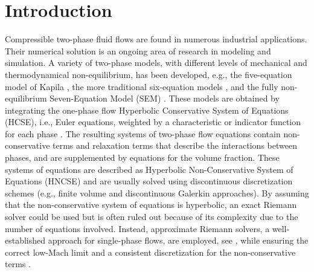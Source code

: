 \section{Introduction}\label{sec:intro}
%
Compressible two-phase fluid flows are found in numerous industrial applications. Their numerical solution is an ongoing area of research 
in modeling and simulation. 
A variety of two-phase models, with different levels of mechanical and thermodynamical non-equilibrium, has been developed, e.g., 
the five-equation model of Kapila \cite{Kapila_2001,GuillardMurrone2003,Saurel_2009}, 
the more traditional six-equation models \cite{Stadtke}, 
and the fully non-equilibrium Seven-Equation Model (SEM) \cite{Berry_1985,BaerNunziato,Saurel_2001b,SEM}. 
These models are obtained by integrating the one-phase flow Hyperbolic Conservative System of Equations (HCSE), 
i.e., Euler equations, weighted by a characteristic or indicator function for each phase \cite{DrewPassman,SEM}.
The resulting systems of two-phase flow equations contain non-conservative terms and relaxation terms that 
describe the interactions between phases, and are supplemented by equations for the volume fraction. 
These systems of equations are described as Hyperbolic Non-Conservative System of Equations (HNCSE) 
and are usually solved using discontinuous discretization schemes (e.g., finite volume and discontinuous 
Galerkin approaches). By assuming that the non-conservative system of equations is hyperbolic, an exact Riemann solver 
could be used but is often ruled out because of its complexity due to the number of equations involved. 
Instead, approximate Riemann solvers, a well-established approach for single-phase flows, are employed, 
see \cite{Saurel_2001a,Saurel_2001b,Li_2004,Zein_2010,Ambroso_2012}, while ensuring the correct 
low-Mach limit and a consistent discretization for the non-conservative terms \cite{Li_2004,Abgrall_2002}.

